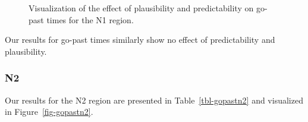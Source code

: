\documentclass[
  letterpaper,
  DIV=11,
  numbers=noendperiod,
  nottoc]{scrreprt}
\begin{document}
\begin{figure}[htbp]


\caption{\label{fig-gopastn1}Visualization of the effect of plausibility
and predictability on go-past times for the N1 region.}

\end{figure}%

Our results for go-past times similarly show no effect of predictability
and plausibility.

\subsubsection{N2}\label{n2-2}

Our results for the N2 region are presented in Table~\ref{tbl-gopastn2}
and visualized in Figure~\ref{fig-gopastn2}.
\end{document}
